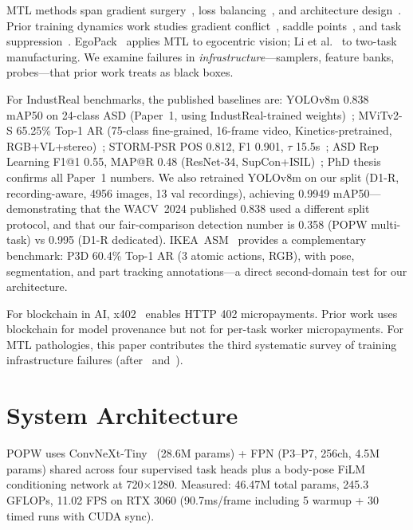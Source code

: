 \documentclass[conference]{IEEEtran}
\newcommand{\popw}{POPW}
\newcommand{\industreal}{IndustReal}
\begin{document}
MTL methods span gradient surgery~\cite{pcgrad2020,cagrad2021,navon2022gradient}, loss balancing~\cite{kendall2018multi,chen2018gradnorm}, and architecture design~\cite{misra2016cross}. Prior training dynamics work studies gradient conflict~\cite{shamsian2024understanding}, saddle points~\cite{xin2024saddle}, and task suppression~\cite{wang2024mtl}. EgoPack~\cite{peirone2024egopack} applies MTL to egocentric vision; Li et al.~\cite{li2025} to two-task manufacturing. We examine failures in \emph{infrastructure}---samplers, feature banks, probes---that prior work treats as black boxes.

For \industreal{} benchmarks, the published baselines are: YOLOv8m 0.838 mAP50 on 24-class ASD (Paper~1, using IndustReal-trained weights)~\cite{schoonbeek2024industreal}; MViTv2-S 65.25\% Top-1 AR (75-class fine-grained, 16-frame video, Kinetics-pretrained, RGB+VL+stereo)~\cite{schoonbeek2024industreal}; STORM-PSR POS 0.812, F1 0.901, $\tau$ 15.5s~\cite{schoonbeek2025storm}; ASD Rep Learning F1@1 0.55, MAP@R 0.48 (ResNet-34, SupCon+ISIL)~\cite{asdrep2024}; PhD thesis \cite{schoonbeek2024phd} confirms all Paper~1 numbers. We also retrained YOLOv8m on our split (D1-R, recording-aware, 4956 images, 13 val recordings), achieving 0.9949 mAP50---demonstrating that the WACV~2024 published 0.838 used a different split protocol, and that our fair-comparison detection number is 0.358 (POPW multi-task) vs 0.995 (D1-R dedicated). IKEA~ASM~\cite{benshabat2021ikea} provides a complementary benchmark: P3D 60.4\% Top-1 AR (3 atomic actions, RGB), with pose, segmentation, and part tracking annotations---a direct second-domain test for our architecture.

For blockchain in AI, x402~\cite{x402spec} enables HTTP 402 micropayments. Prior work uses blockchain for model provenance but not for per-task worker micropayments. For MTL pathologies, this paper contributes the third systematic survey of training infrastructure failures (after~\cite{wang2024mtl} and~\cite{shamsian2024understanding}).

\section{System Architecture}
\label{sec:arch}

\popw{} uses ConvNeXt-Tiny~\cite{liu2022convnet} (28.6M params) + FPN (P3--P7, 256ch, 4.5M params) shared across four supervised task heads plus a body-pose FiLM conditioning network at 720$\times$1280. Measured: 46.47M total params, 245.3 GFLOPs, 11.02 FPS on RTX 3060 (90.7ms/frame including 5 warmup + 30 timed runs with CUDA sync).
\end{document}
